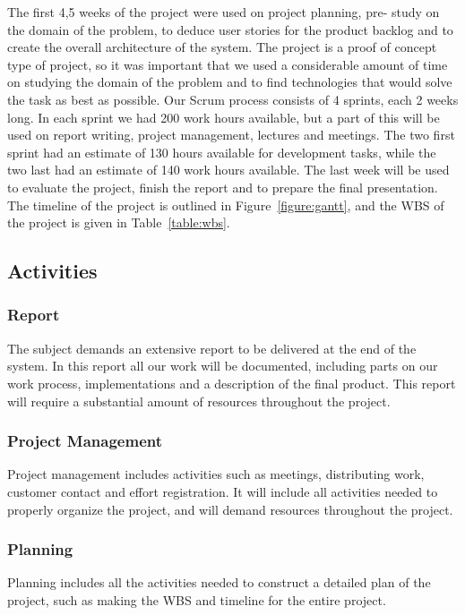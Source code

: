 The first 4,5 weeks of the project were used on project planning, pre- study on the domain of the problem, to deduce user stories for the product backlog and to create the overall architecture of the system. The project is a proof of concept type of project, so it was important that we used a considerable amount of time on studying the domain of the problem and to find technologies that would solve the task as best as possible. Our Scrum process consists of 4 sprints, each 2 weeks long. In each sprint we had 200 work hours available, but a part of this will be used on report writing, project management, lectures and meetings. The two first sprint had an estimate of 130 hours available for development tasks, while the two last had an estimate of 140 work hours available. The last week will be used to evaluate the project, finish the report and to prepare the final presentation. The timeline of the project is outlined in Figure~\ref{figure:gantt}, and the WBS of the project is given in Table~\ref{table:wbs}.

\subsection{Activities}
\subsubsection{Report}
The subject demands an extensive report to be delivered at the end of the system. In this report all our work will be documented, including parts on our work process, implementations and a description of the final product. This report will require a substantial amount of resources throughout the project.

\subsubsection{Project Management}
Project management includes activities such as meetings, distributing work, customer contact and effort registration. It will include all activities needed to properly organize the project, and will demand resources throughout the project. 

\subsubsection{Planning}
Planning includes all the activities needed to construct a detailed plan of the project, such as making the WBS and timeline for the entire project. 

